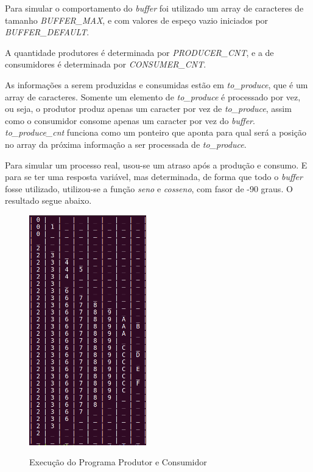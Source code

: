 \documentclass[a4paper, 11pt]{article}
\begin{document}
Para simular o comportamento do \textit{buffer} foi utilizado um array de caracteres de tamanho \textit{BUFFER\_MAX}, e com valores de espeço vazio iniciados por \textit{BUFFER\_DEFAULT}.

A quantidade produtores é determinada por \textit{PRODUCER\_CNT}, e a de consumidores é determinada por \textit{CONSUMER\_CNT}.

As informações a serem produzidas e consumidas estão em \textit{to\_produce}, que é um array de caracteres. Somente um elemento de \textit{to\_produce} é processado por vez, ou seja, o produtor produz apenas um caracter por vez de \textit{to\_produce}, assim como o consumidor consome apenas um caracter por vez do \textit{buffer}. \textit{to\_produce\_cnt} funciona como um ponteiro que aponta para qual será a posição no array da próxima informação a ser processada de \textit{to\_produce}.

Para simular um processo real, usou-se um atraso após a produção e consumo. E para se ter uma resposta variável, mas determinada, de forma que todo o \textit{buffer} fosse utilizado, utilizou-se a função \textit{seno} e \textit{cosseno}, com fasor de -90 graus. O resultado segue abaixo.

\begin{figure}[!h]
\caption{Execução do Programa Produtor e Consumidor}
\includegraphics[height=10cm]{produtor_consumidor}
\centering
\label{fig1}
\end{figure}
\end{document}
